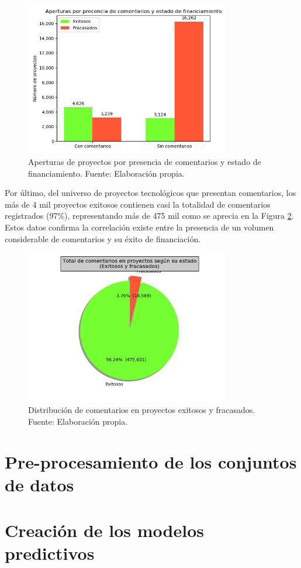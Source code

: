 \begin{figure}[h]
	\begin{center}
		\includegraphics[width=0.8\textwidth]{4/figures/projects comment by state.png}
		\caption{Aperturas de proyectos por presencia de comentarios y estado de financiamiento. Fuente: Elaboración propia.}
		\label{4:fig5}
	\end{center}
\end{figure}

Por último, del universo de proyectos tecnológicos que presentan comentarios, los más de 4 mil proyectos exitosos contienen casi la totalidad de comentarios registrados (97\%), representando más de 475 mil como se aprecia en la Figura \ref{4:fig6}. Estos datos confirma la correlación existe entre la presencia de un volumen considerable de comentarios y su éxito de financiación.

\begin{figure}[h]
	\begin{center}
		\includegraphics[width=0.8\textwidth]{4/figures/total comments by projects state.png}
		\caption{Distribución de comentarios en proyectos exitosos y fracasados. Fuente: Elaboración propia.}
		\label{4:fig6}
	\end{center}
\end{figure}

\section{Pre-procesamiento de los conjuntos de datos}

\section{Creación de los modelos predictivos}
